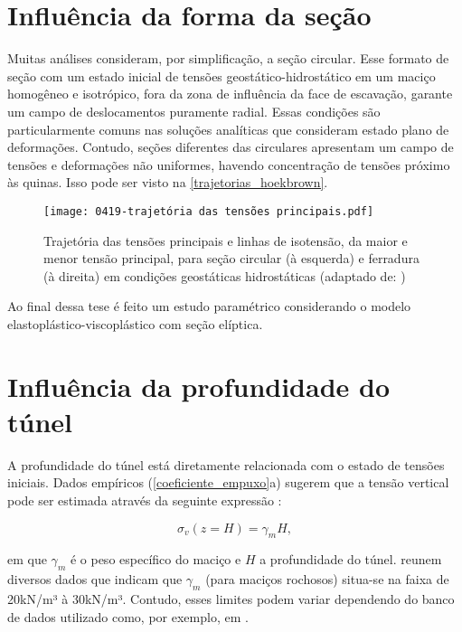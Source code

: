 \section{Influência da forma da seção}

Muitas análises consideram, por simplificação, a seção circular. Esse formato de seção com um estado inicial de tensões geostático-hidrostático em um maciço homogêneo e isotrópico, fora da zona de influência da face de escavação, garante um campo de deslocamentos puramente radial. Essas condições são particularmente comuns nas soluções analíticas que consideram estado plano de deformações. Contudo, seções diferentes das circulares apresentam um campo de tensões e deformações não uniformes, havendo concentração de tensões próximo às quinas. Isso pode ser visto na \autoref{trajetorias_hoekbrown}.

\begin{figure}[H]
	\begin{center}
		\texttt{[image: 0419-trajetória das tensões principais.pdf]}
	\end{center}
	\caption{\label{trajetorias_hoekbrown}Trajetória das tensões principais e linhas de isotensão, da maior e menor tensão principal, para seção circular (à esquerda) e ferradura (à direita) em condições geostáticas hidrostáticas (adaptado de: )}
\end{figure}

Ao final dessa tese é feito um estudo paramétrico considerando o modelo elastoplástico-viscoplástico com seção elíptica.

\section{Influência da profundidade do túnel}
\label{cap:Influência da profundidade do túnel}
A profundidade do túnel está diretamente relacionada com o estado de tensões iniciais. Dados empíricos (\autoref{coeficiente_empuxo}a) sugerem que a tensão vertical pode ser estimada através da seguinte expressão \cite[p. 96]{Hoek1980}:

\begin{equation}
	\sigma_v(z=H)= \gamma_m H ,
\end{equation}

em que $\gamma_m$ é o peso específico do maciço e $H$ a profundidade do túnel.  reunem diversos dados que indicam que $\gamma_m$ (para maciços rochosos) situa-se na faixa de 20kN/m³ à 30kN/m³. Contudo, esses limites podem variar dependendo do banco de dados utilizado como, por exemplo, em .

